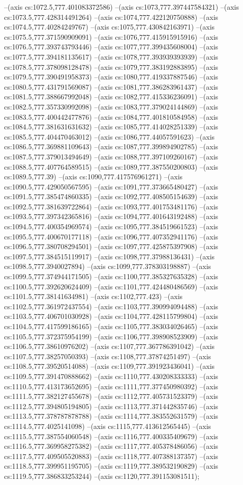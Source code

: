 --(axis cs:1072.5,777.401083372586)
--(axis cs:1073,777.397447584321)
--(axis cs:1073.5,777.428314491264)
--(axis cs:1074,777.422120750888)
--(axis cs:1074.5,777.40284249767)
--(axis cs:1075,777.430842163971)
--(axis cs:1075.5,777.371590909091)
--(axis cs:1076,777.415915915916)
--(axis cs:1076.5,777.393743793446)
--(axis cs:1077,777.399435608004)
--(axis cs:1077.5,777.394181135617)
--(axis cs:1078,777.393939393939)
--(axis cs:1078.5,777.378098128478)
--(axis cs:1079,777.383192883895)
--(axis cs:1079.5,777.390491958373)
--(axis cs:1080,777.419337887546)
--(axis cs:1080.5,777.431791569087)
--(axis cs:1081,777.386283961437)
--(axis cs:1081.5,777.388667992048)
--(axis cs:1082,777.415336236091)
--(axis cs:1082.5,777.357330992098)
--(axis cs:1083,777.379024144869)
--(axis cs:1083.5,777.400442477876)
--(axis cs:1084,777.401810584958)
--(axis cs:1084.5,777.381631631632)
--(axis cs:1085,777.414028251339)
--(axis cs:1085.5,777.404470463012)
--(axis cs:1086,777.44057591623)
--(axis cs:1086.5,777.369881109643)
--(axis cs:1087,777.399894902785)
--(axis cs:1087.5,777.379013494649)
--(axis cs:1088,777.397109260167)
--(axis cs:1088.5,777.407764589515)
--(axis cs:1089,777.387550200803)
--(axis cs:1089.5,777.39)
--(axis cs:1090,777.417576961271)
--(axis cs:1090.5,777.429050567595)
--(axis cs:1091,777.373665480427)
--(axis cs:1091.5,777.385474860335)
--(axis cs:1092,777.408505154639)
--(axis cs:1092.5,777.381639722864)
--(axis cs:1093,777.401753481176)
--(axis cs:1093.5,777.397342365816)
--(axis cs:1094,777.401643192488)
--(axis cs:1094.5,777.400354969574)
--(axis cs:1095,777.384519661523)
--(axis cs:1095.5,777.400670177118)
--(axis cs:1096,777.407352941176)
--(axis cs:1096.5,777.380708294501)
--(axis cs:1097,777.425875397908)
--(axis cs:1097.5,777.384515119917)
--(axis cs:1098,777.37988136431)
--(axis cs:1098.5,777.3940027894)
--(axis cs:1099,777.378303198887)
--(axis cs:1099.5,777.374944171505)
--(axis cs:1100,777.385327635328)
--(axis cs:1100.5,777.392620624409)
--(axis cs:1101,777.424480486569)
--(axis cs:1101.5,777.38141634981)
--(axis cs:1102,777.423)
--(axis cs:1102.5,777.361972437554)
--(axis cs:1103,777.390994094488)
--(axis cs:1103.5,777.406701030928)
--(axis cs:1104,777.428115799804)
--(axis cs:1104.5,777.417599186165)
--(axis cs:1105,777.383034026465)
--(axis cs:1105.5,777.372375954199)
--(axis cs:1106,777.398908523909)
--(axis cs:1106.5,777.38610976202)
--(axis cs:1107,777.367786391042)
--(axis cs:1107.5,777.38257050393)
--(axis cs:1108,777.37874251497)
--(axis cs:1108.5,777.39520514088)
--(axis cs:1109,777.391923436041)
--(axis cs:1109.5,777.391470888662)
--(axis cs:1110,777.430208333333)
--(axis cs:1110.5,777.413173652695)
--(axis cs:1111,777.377450980392)
--(axis cs:1111.5,777.382127455678)
--(axis cs:1112,777.405731523379)
--(axis cs:1112.5,777.394805194805)
--(axis cs:1113,777.371442835746)
--(axis cs:1113.5,777.378787878788)
--(axis cs:1114,777.383552631579)
--(axis cs:1114.5,777.4025141098)
--(axis cs:1115,777.413612565445)
--(axis cs:1115.5,777.387554060548)
--(axis cs:1116,777.400335409679)
--(axis cs:1116.5,777.369958275382)
--(axis cs:1117,777.405378486056)
--(axis cs:1117.5,777.409505520883)
--(axis cs:1118,777.407388137357)
--(axis cs:1118.5,777.399951195705)
--(axis cs:1119,777.389532190829)
--(axis cs:1119.5,777.386833253244)
--(axis cs:1120,777.391153081511);


